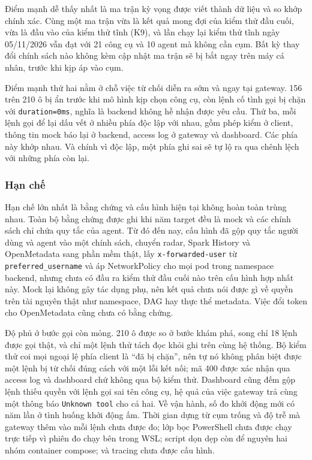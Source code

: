 Điểm mạnh dễ thấy nhất là ma trận kỳ vọng được viết thành dữ liệu và so khớp chính xác. Cùng một ma trận vừa là kết quả mong đợi của kiểm thử đầu cuối, vừa là đầu vào của kiểm thử tĩnh (K9), và lần chạy lại kiểm thử tĩnh ngày 05/11/2026 vẫn đạt với 21 công cụ và 10 agent mà không cần cụm. Bất kỳ thay đổi chính sách nào không kèm cập nhật ma trận sẽ bị bắt ngay trên máy cá nhân, trước khi kịp áp vào cụm.

Điểm mạnh thứ hai nằm ở chỗ việc từ chối diễn ra sớm và ngay tại gateway. 156 trên 210 ô bị ẩn trước khi mô hình kịp chọn công cụ, còn lệnh cố tình gọi bị chặn với \texttt{duration=0ms}, nghĩa là backend không hề nhận được yêu cầu. Thứ ba, mỗi lệnh gọi để lại dấu vết ở nhiều phía độc lập với nhau, gồm phép kiểm ở client, thông tin mock báo lại ở backend, access log ở gateway và dashboard. Các phía này khớp nhau. Và chính vì độc lập, một phía ghi sai sẽ tự lộ ra qua chênh lệch với những phía còn lại.

\subsubsection{Hạn chế}

Hạn chế lớn nhất là bằng chứng và cấu hình hiện tại không hoàn toàn trùng nhau. Toàn bộ bằng chứng được ghi khi năm target đều là mock và các chính sách chỉ chứa quy tắc của agent. Từ đó đến nay, cấu hình đã gộp quy tắc người dùng và agent vào một chính sách, chuyển radar, Spark History và OpenMetadata sang phần mềm thật, lấy \texttt{x-forwarded-user} từ \texttt{preferred\_username} và áp NetworkPolicy cho mọi pod trong namespace backend, nhưng chưa có đầu ra kiểm thử đầu cuối nào trên cấu hình hợp nhất này. Mock lại không gây tác dụng phụ, nên kết quả chưa nói được gì về quyền trên tài nguyên thật như namespace, DAG hay thực thể metadata. Việc đổi token cho OpenMetadata cũng chưa có bằng chứng.

Độ phủ ở bước gọi còn mỏng. 210 ô được so ở bước khám phá, song chỉ 18 lệnh được gọi thật, và chỉ một lệnh thử tách đọc khỏi ghi trên cùng hệ thống. Bộ kiểm thử coi mọi ngoại lệ phía client là ``đã bị chặn'', nên tự nó không phân biệt được một lệnh bị từ chối đúng cách với một lỗi kết nối; mã 400 được xác nhận qua access log và dashboard chứ không qua bộ kiểm thử. Dashboard cũng đếm gộp lệnh thiếu quyền với lệnh gọi sai tên công cụ, hệ quả của việc gateway trả cùng một thông báo \texttt{Unknown tool} cho cả hai. Về vận hành, số đo khởi động mới có năm lần ở tình huống khởi động ấm. Thời gian dựng từ cụm trống và độ trễ mà gateway thêm vào mỗi lệnh chưa được đo; lớp bọc PowerShell chưa được chạy trực tiếp vì phiên đo chạy bên trong WSL; script dọn dẹp còn để nguyên hai nhóm container compose; và tracing chưa được cấu hình.

\endgroup
